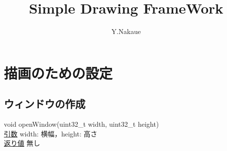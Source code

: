 \documentclass[a4paper, 11pt, oneside, onecolumn, openany]{jsarticle}
\begin{document}

\title{\vspace{-3cm}Simple Drawing FrameWork}
\author{Y.Nakaue}
\maketitle


\section{描画のための設定}
\subsection{ウィンドウの作成}
\noindent
\tab void openWindow(uint32\_t width, uint32\_t height) \\
\tab \underline{引数} \tab width: 横幅，height: 高さ \\
\tab \underline{返り値} \tab 無し
\end{document}

